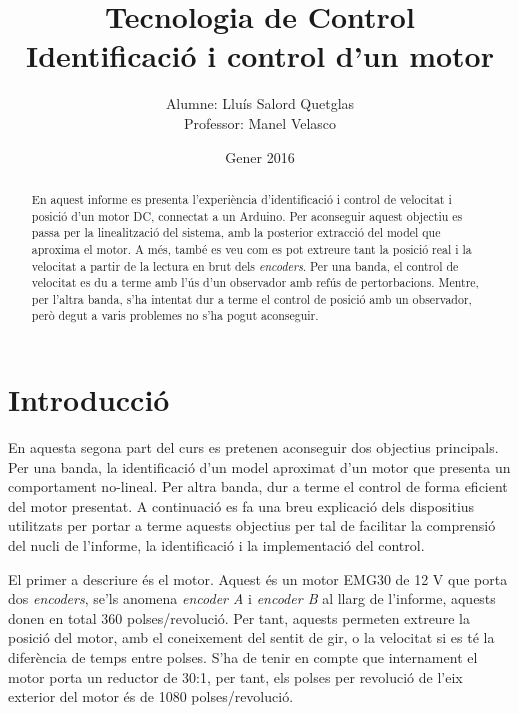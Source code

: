 \documentclass[12pt,a4paper,final,twoside,openright]{report}
\title{Tecnologia de Control \\ Identificació i control d'un motor}
\author{Alumne: Lluís Salord Quetglas \\ Professor: Manel Velasco}
\date{Gener 2016}
\begin{document}
\maketitle
\thispagestyle{empty}

\cleardoublepage

\setcounter{page}{1} %

\begin{abstract}
En aquest informe es presenta l'experiència d'identificació i control de velocitat i posició d'un motor DC, connectat a un Arduino. Per aconseguir aquest objectiu es passa per la linealització del sistema, amb la posterior extracció del model que aproxima el motor. A més, també es veu com es pot extreure tant la posició real i la velocitat a partir de la lectura en brut dels \textit{encoders}. Per una banda, el control de velocitat es du a terme amb l'ús d'un observador amb refús de pertorbacions. Mentre, per l'altra banda, s'ha intentat dur a terme el control de posició amb un observador, però degut a varis problemes no s'ha pogut aconseguir.
\end{abstract}

\tableofcontents

\listoffigures

\listoftables

\chapter{Introducció}

En aquesta segona part del curs es pretenen aconseguir dos objectius principals. Per una banda, la identificació d'un model aproximat d'un motor que presenta un comportament no-lineal. Per altra banda, dur a terme el control de forma eficient del motor presentat. A continuació es fa una breu explicació dels dispositius utilitzats per portar a terme aquests objectius per tal de facilitar la comprensió del nucli de l'informe, la identificació i la implementació del control.

El primer a descriure és el motor. Aquest és un motor EMG30 de 12 V que porta dos \textit{encoders}, se'ls anomena \textit{encoder A} i \textit{encoder B} al llarg de l'informe, aquests donen en total 360 polses/revolució. Per tant, aquests permeten extreure la posició del motor, amb el coneixement del sentit de gir, o la velocitat si es té la diferència de temps entre polses. S'ha de tenir en compte que internament el motor porta un reductor de 30:1, per tant, els polses per revolució de l'eix exterior del motor és de 1080 polses/revolució. 
\end{document}
